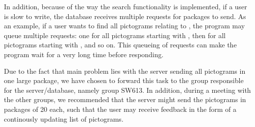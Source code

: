 In addition, because of the way the search functionality is
implemented, if a user is slow to write, the database receives multiple requests
for packages to send. As an example, if a user wants to find all pictograms
relating to , the program may queue multiple requests: one for
all pictograms starting with , then for all pictograms starting with
, and so on. This queueing of requests can make the program wait for a
very long time before responding.\nl

Due to the fact that main problem lies with the server sending all pictograms in
one large package, we have chosen to forward this task to the group responsible
for the server/database, namely group SW613. In addition, during a meeting with
the other groups, we recommended that the server might send the pictograms in
packages of 20 each, such that the user may receive feedback in the form of a
continously updating list of pictograms.
 

